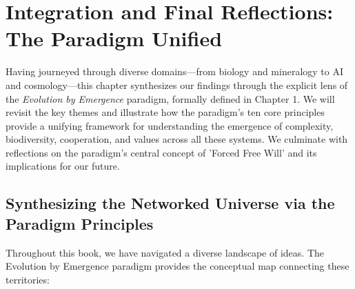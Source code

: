 \chapter{Integration and Final Reflections: The Paradigm Unified} %
\label{ch:Integration}

Having journeyed through diverse domains—from biology and mineralogy to AI and cosmology—this chapter synthesizes our findings through the explicit lens of the \emph{Evolution by Emergence} paradigm, formally defined in Chapter 1. We will revisit the key themes and illustrate how the paradigm's ten core principles provide a unifying framework for understanding the emergence of complexity, biodiversity, cooperation, and values across all these systems. We culminate with reflections on the paradigm's central concept of 'Forced Free Will' and its implications for our future. %

\section{Synthesizing the Networked Universe via the Paradigm Principles} %
Throughout this book, we have navigated a diverse landscape of ideas. The Evolution by Emergence paradigm provides the conceptual map connecting these territories:


